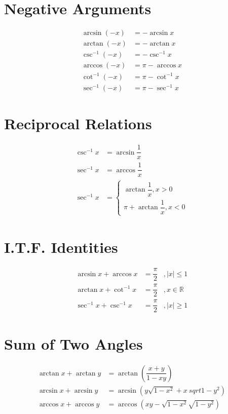 \documentclass[../main.tex]{subfile}
\begin{document}
    \section{Negative Arguments}
    \begin{align}
        \arcsin (-x) & = -\arcsin x\\
        \arctan (-x) & = -\arctan x\\
        \csc^{-1} (-x) & = -\csc^{-1} x\\
        \arccos (-x) & = \pi - \arccos x\\
        \cot^{-1} (-x) & = \pi - \cot^{-1} x\\
        \sec^{-1} (-x) & = \pi - \sec^{-1} x
    \end{align}

    \section{Reciprocal Relations}
    \begin{align}
        \csc^{-1} x & = \arcsin \dfrac{1}{x}\\
        \sec^{-1} x & = \arccos \dfrac{1}{x}\\
        \sec^{-1} x & = \begin{cases}
                            \arctan \dfrac{1}{x}, x>0\\
                            \pi+\arctan \dfrac{1}{x}, x<0
                        \end{cases}
    \end{align}

    \section{I.T.F. Identities}
    \begin{align}
        \arcsin x + \arccos x & = \dfrac{\pi}{2} &, \lvert x \rvert \leq 1\\
        \arctan x + \cot^{-1} x & = \dfrac{\pi}{2} &, x\in\mathbb{R}\\
        \sec^{-1} x + \csc^{-1} x & = \dfrac{\pi}{2} &, \lvert x \rvert \geq 1
    \end{align}

    \section{Sum of Two Angles}
    \begin{align}
        \arctan x + \arctan y & = \arctan \left(\dfrac{x + y}{1 - xy} \right)\\
        \arcsin x + \arcsin y & = \arcsin \left( y \sqrt{1-x^2} + x\ sqrt{1-y^2} \right)\\
        \arccos x + \arccos y & = \arccos \left( xy - \sqrt{1-x^2} \sqrt{1-y^2} \right)
    \end{align}
\end{document}
